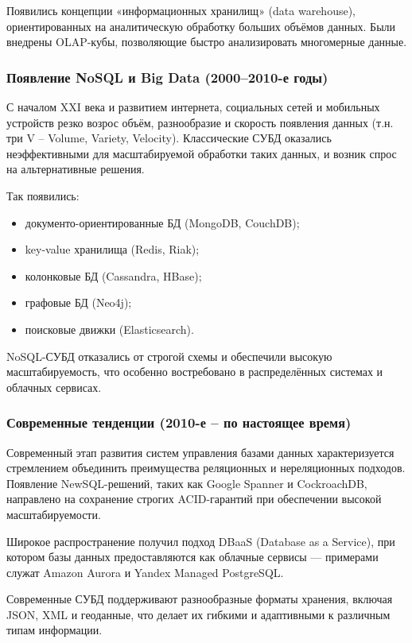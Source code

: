 Появились концепции «информационных хранилищ» (data warehouse), ориентированных на аналитическую обработку больших объёмов данных. Были внедрены OLAP-кубы, позволяющие быстро анализировать многомерные данные.

\subsubsection{Появление NoSQL и Big Data (2000--2010-е годы)}

С началом XXI века и развитием интернета, социальных сетей и мобильных устройств резко возрос объём, разнообразие и скорость появления данных (т.н. три V -- Volume, Variety, Velocity). Классические СУБД оказались неэффективными для масштабируемой обработки таких данных, и возник спрос на альтернативные решения.

Так появились:
\begin{itemize}
	\item документо-ориентированные БД (MongoDB, CouchDB);
	\item key-value хранилища (Redis, Riak);
	\item колонковые БД (Cassandra, HBase);
	\item графовые БД (Neo4j);
	\item поисковые движки (Elasticsearch).
\end{itemize}

NoSQL-СУБД отказались от строгой схемы и обеспечили высокую масштабируемость, что особенно востребовано в распределённых системах и облачных сервисах.

\subsubsection{Современные тенденции (2010-е -- по настоящее время)}

Современный этап развития систем управления базами данных характеризуется стремлением объединить преимущества реляционных и нереляционных подходов. Появление NewSQL-решений, таких как Google Spanner и CockroachDB, направлено на сохранение строгих ACID-гарантий при обеспечении высокой масштабируемости.

Широкое распространение получил подход DBaaS (Database as a Service), при котором базы данных предоставляются как облачные сервисы — примерами служат Amazon Aurora и Yandex Managed PostgreSQL.

Современные СУБД поддерживают разнообразные форматы хранения, включая JSON, XML и геоданные, что делает их гибкими и адаптивными к различным типам информации. 

